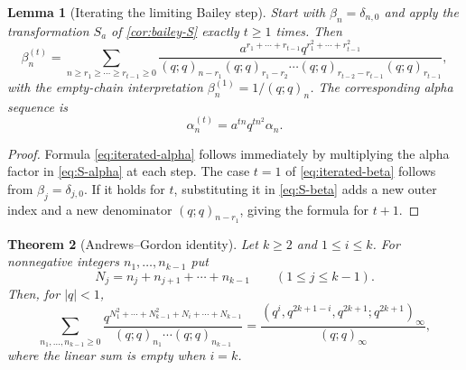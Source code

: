\documentclass[11pt]{article}
\theoremstyle{blueplain}
\newtheorem{theorem}{Theorem}[section]
\newtheorem{lemma}[theorem]{Lemma}
\theoremstyle{bluedef}
\begin{document}
\begin{lemma}[Iterating the limiting Bailey step]\label{lem:iterated-S}
Start with $\beta_n=\delta_{n,0}$ and apply the transformation $S_a$ of \cref{cor:bailey-S} exactly $t\ge1$ times.  Then
\begin{equation}\label{eq:iterated-beta}
\beta_n^{(t)}=
\sum_{n\ge r_1\ge\cdots\ge r_{t-1}\ge0}
\frac{a^{r_1+\cdots+r_{t-1}}
 q^{r_1^2+\cdots+r_{t-1}^2}}
{(q;q)_{n-r_1}(q;q)_{r_1-r_2}\cdots
 (q;q)_{r_{t-2}-r_{t-1}}(q;q)_{r_{t-1}}},
\end{equation}
with the empty-chain interpretation $\beta_n^{(1)}=1/(q;q)_n$.  The corresponding alpha sequence is
\begin{equation}\label{eq:iterated-alpha}
\alpha_n^{(t)}=a^{tn}q^{tn^2}\alpha_n.
\end{equation}
\end{lemma}

\begin{proof}
Formula \eqref{eq:iterated-alpha} follows immediately by multiplying the alpha factor in \eqref{eq:S-alpha} at each step.  The case $t=1$ of \eqref{eq:iterated-beta} follows from $\beta_j=\delta_{j,0}$.  If it holds for $t$, substituting it in \eqref{eq:S-beta} adds a new outer index and a new denominator $(q;q)_{n-r_1}$, giving the formula for $t+1$.
\end{proof}

\begin{theorem}[Andrews--Gordon identity]\label{thm:AG}
Let $k\ge2$ and $1\le i\le k$.  For nonnegative integers $n_1,\ldots,n_{k-1}$ put
\[
N_j=n_j+n_{j+1}+\cdots+n_{k-1}\qquad(1\le j\le k-1).
\]
Then, for $|q|<1$,
\begin{equation}\label{eq:AG}
\sum_{n_1,\ldots,n_{k-1}\ge0}
\frac{q^{N_1^2+\cdots+N_{k-1}^2+N_i+\cdots+N_{k-1}}}
{(q;q)_{n_1}\cdots(q;q)_{n_{k-1}}}
=
\frac{(q^i,q^{2k+1-i},q^{2k+1};q^{2k+1})_\infty}
{(q;q)_\infty},
\end{equation}
where the linear sum is empty when $i=k$.
\end{theorem}
\end{document}
